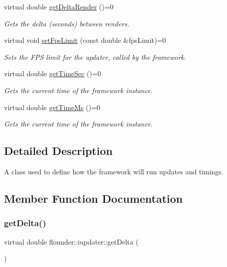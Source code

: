 \begin{DoxyCompactItemize}
virtual double \hyperlink{classflounder_1_1iupdater_a00d7cf530cfbd7f83c8903328da14027}{get\+Delta\+Render} ()=0
\begin{DoxyCompactList}\small\item\em Gets the delta (seconds) between renders. \end{DoxyCompactList}\item 
virtual void \hyperlink{classflounder_1_1iupdater_a09eee014e76b7a0217d2bcdf41e0f3f4}{set\+Fps\+Limit} (const double \&fps\+Limit)=0
\begin{DoxyCompactList}\small\item\em Sets the F\+PS limit for the updater, called by the framework. \end{DoxyCompactList}\item 
virtual double \hyperlink{classflounder_1_1iupdater_a071086b844e1f90d7f3577e80c9c09fe}{get\+Time\+Sec} ()=0
\begin{DoxyCompactList}\small\item\em Gets the current time of the framework instance. \end{DoxyCompactList}\item 
virtual double \hyperlink{classflounder_1_1iupdater_a56548faad88ad85e0cb4bc96af0912d6}{get\+Time\+Ms} ()=0
\begin{DoxyCompactList}\small\item\em Gets the current time of the framework instance. \end{DoxyCompactList}\end{DoxyCompactItemize}


\subsection{Detailed Description}
A class used to define how the framework will run updates and timings. 



\subsection{Member Function Documentation}
\mbox{\label{classflounder_1_1iupdater_a1e8d40602f9799fc82d96d5b845cf796}} 
\subsubsection{\texorpdfstring{get\+Delta()}{getDelta()}}
{\footnotesize\ttfamily virtual double flounder\+::iupdater\+::get\+Delta (\begin{DoxyParamCaption}{ }\end{DoxyParamCaption})\hspace{0.3cm}{\ttfamily [pure virtual]}}



